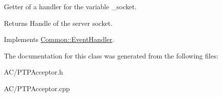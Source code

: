 Getter of a handler for the variable \-\_\-socket. 

\begin{DoxyReturn}{Returns}
Handle of the server socket. 
\end{DoxyReturn}


Implements \hyperlink{class_common_1_1_event_handler_aaf6cb56038c6fe6b91c9d1e34ee6b3af}{Common\-::\-Event\-Handler}.



The documentation for this class was generated from the following files\-:\begin{DoxyCompactItemize}
\item 
A\-C/P\-T\-P\-Acceptor.\-h\item 
A\-C/P\-T\-P\-Acceptor.\-cpp\end{DoxyCompactItemize}

